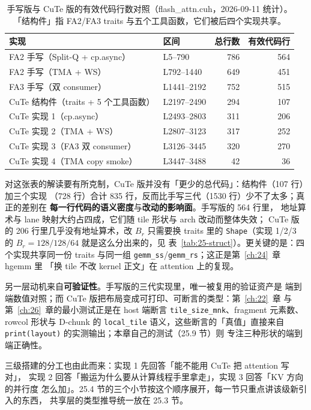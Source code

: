 \begin{table}[htbp]
\centering
\caption{手写版与 CuTe 版的有效代码行数对照（flash\_attn.cuh，2026-09-11 统计）。
「结构件」指 FA2/FA3 traits 与五个工具函数，它们被后四个实现共享。}
\label{tab:25-code}
\begin{tabular}{llrr}
\toprule
实现 & 区间 & 总行数 & 有效代码行 \\
\midrule
FA2 手写（Split-Q + cp.async） & L5--790 & 786 & 564 \\
FA2 手写（TMA + WS） & L792--1440 & 649 & 451 \\
FA3 手写（双 consumer） & L1441--2192 & 752 & 515 \\
\midrule
CuTe 结构件（traits + 5 个工具函数） & L2197--2490 & 294 & 107 \\
CuTe 实现 1（cp.async） & L2493--2803 & 311 & 206 \\
CuTe 实现 2（TMA + WS） & L2807--3123 & 317 & 252 \\
CuTe 实现 3（FA3 双 consumer） & L3126--3445 & 320 & 270 \\
CuTe 实现 4（TMA copy smoke） & L3447--3488 & 42 & 36 \\
\bottomrule
\end{tabular}
\end{table}

对这张表的解读要有所克制，CuTe 版并没有「更少的总代码」：结构件（107 行）加三个实现
（728 行）合计 835 行，反而比手写三代（1530 行）少不了太多；真正的差别在
\textbf{每一行代码的语义密度}与\textbf{改动的影响面}。手写版的 564 行里，
地址算术与 lane 映射大约占四成，它们随 tile 形状与 arch 改动而整体失效；
CuTe 版的 206 行里几乎没有地址算术，改 $B_r$ 只需要换 traits 里的
\texttt{Shape}（实现 1/2/3 的 $B_r{=}128/128/64$ 就是这么分出来的，见
表~\ref{tab:25-struct}）。更关键的是：四个实现共享同一份 traits 与同一组
\texttt{gemm\_ss}/\texttt{gemm\_rs}；这正是第~\ref{ch:24}~章 hgemm 里
「换 tile 不改 kernel 正文」在 attention 上的复现。

另一层动机来自\textbf{可验证性}。手写版的三代实现里，唯一被复用的验证资产是
端到端数值对照；而 CuTe 版把布局变成可打印、可断言的类型：第~\ref{ch:22}~章
与第~\ref{ch:26}~章的最小测试正是在 host 端断言
\texttt{tile\_\allowbreak{}size\_\allowbreak{}mnk}、fragment 元素数、rowcol 形状与
D-chunk 的 \texttt{local\_tile} 语义，这些断言的「真值」直接来自
\texttt{print\allowbreak{}(layout)} 的实测输出；本章自己的测试（25.9 节）则
专注三种形状的端到端正确性。

三级搭建的分工也由此而来：实现 1 先回答「能不能用 CuTe 把 attention 写对」，
实现 2 回答「搬运为什么要从计算线程手里拿走」，实现 3 回答「KV 方向的并行度
怎么加」。25.4 节的三个小节按这个顺序展开，每一节只重点讲该级新引入的东西，
共享层的类型推导统一放在 25.3 节。

